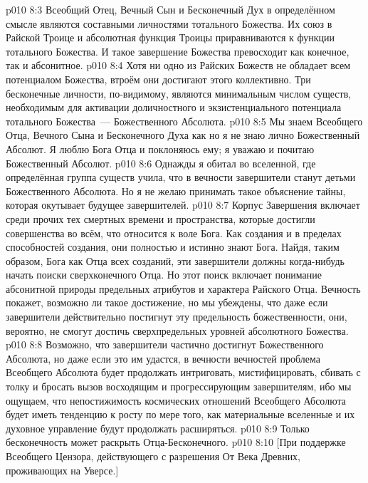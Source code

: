 \vs p010 8:3 \pc Всеобщий Отец, Вечный Сын и Бесконечный Дух в определённом смысле являются составными личностями тотального Божества. Их союз в Райской Троице и абсолютная функция Троицы приравниваются к функции тотального Божества. И такое завершение Божества превосходит как конечное, так и абсонитное.
\vs p010 8:4 Хотя ни одно из Райских Божеств не обладает всем потенциалом Божества, втроём они достигают этого коллективно. Три бесконечные личности, по\hyp{}видимому, являются минимальным числом существ, необходимым для активации доличностного и экзистенциального потенциала тотального Божества~--- Божественного Абсолюта.
\vs p010 8:5 Мы знаем Всеобщего Отца, Вечного Сына и Бесконечного Духа как  но я не знаю лично Божественный Абсолют. Я люблю Бога Отца и поклоняюсь ему; я уважаю и почитаю Божественный Абсолют.
\vs p010 8:6 \pc Однажды я обитал во вселенной, где определённая группа существ учила, что в вечности завершители станут детьми Божественного Абсолюта. Но я не желаю принимать такое объяснение тайны, которая окутывает будущее завершителей.
\vs p010 8:7 Корпус Завершения включает среди прочих тех смертных времени и пространства, которые достигли совершенства во всём, что относится к воле Бога. Как создания и в пределах способностей создания, они полностью и истинно знают Бога. Найдя, таким образом, Бога как Отца всех созданий, эти завершители должны когда\hyp{}нибудь начать поиски сверхконечного Отца. Но этот поиск включает понимание абсонитной природы предельных атрибутов и характера Райского Отца. Вечность покажет, возможно ли такое достижение, но мы убеждены, что даже если завершители действительно постигнут эту предельность божественности, они, вероятно, не смогут достичь сверхпредельных уровней абсолютного Божества.
\vs p010 8:8 Возможно, что завершители частично достигнут Божественного Абсолюта, но даже если это им удастся, в вечности вечностей проблема Всеобщего Абсолюта будет продолжать интриговать, мистифицировать, сбивать с толку и бросать вызов восходящим и прогрессирующим завершителям, ибо мы ощущаем, что непостижимость космических отношений Всеобщего Абсолюта будет иметь тенденцию к росту по мере того, как материальные вселенные и их духовное управление будут продолжать расширяться.
\vs p010 8:9 \pc Только бесконечность может раскрыть Отца\hyp{}Бесконечного.
\vsetoff
\vs p010 8:10 [При поддержке Всеобщего Цензора, действующего с разрешения От Века Древних, проживающих на Уверсе.]
\quizlink

